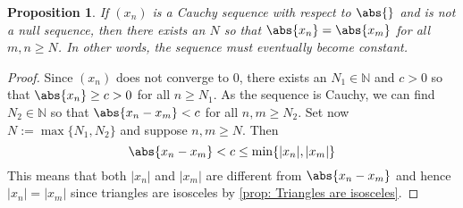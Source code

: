 \documentclass{article}
\newtheorem{proposition}{Proposition}[section]
\newcommand{\mbb}[1]{\mathbb{#1}}
\numberwithin{equation}{section}
\begin{document}
\begin{proposition}\label{prop: Non-archimedian absolute value has constant tail}
    If $(x_n)$ is a Cauchy sequence with respect to $\abs{}$ and is not a null sequence, then there exists an $N$ so that $\abs{x_n} = \abs{x_m}$ for all $m,n \geq N$. In other words, the sequence must eventually become constant.
\end{proposition}
\begin{proof}
    Since $(x_n)$ does not converge to 0, there exists an $N_1 \in \mbb N$ and $c > 0$ so that $\abs{x_n} \geq c > 0$ for all $n \geq N_1$. As the sequence is Cauchy, we can find $N_2 \in \mbb N$ so that $\abs{x_n - x_m} < c$ for all $n,m \geq N_2$. Set now $N := \max \{N_1, N_2\}$ and suppose $n,m \geq N$. Then
    $$\abs{x_n - x_m} <  c \leq \min\{|x_n|, |x_m|\}$$
    This means that both $|x_n|$ and $|x_m|$ are different from $\abs{x_n - x_m}$ and hence $|x_n| = |x_m|$ since triangles are isosceles by \cref{prop: Triangles are isosceles}.
\end{proof}
\end{document}
